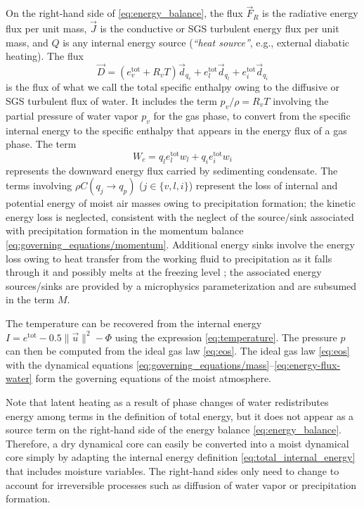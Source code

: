 \documentclass{report}
\begin{document}
On the right-hand side of \eqref{eq:energy_balance}, the flux $\vec{F}_R$ is the radiative energy flux per unit mass, $\vec{J}$ is the conductive or SGS turbulent energy flux per unit mass, and $Q$ is any internal energy source (\emph{``heat source''}, e.g., external diabatic heating). The flux 
\begin{equation}\label{eq:energy-flux-water}
\vec{D} = (e_v^{\mathrm{tot}} + R_v T) \vec{d}_{q_v} + e_l^{\mathrm{tot}} \vec{d}_{q_l} +  e_i^{\mathrm{tot}} \vec{d}_{q_i}
\end{equation}
is the flux of what we call the total specific enthalpy owing to the diffusive or SGS turbulent flux of water. It includes the term $p_v/\rho = R_v T$ involving the partial pressure of water vapor $p_v$ for the gas phase, to convert from the specific internal energy to the specific enthalpy that appears in the energy flux of a gas phase. The term 
\begin{equation}
W_c = q_l e_l^{\mathrm{tot}} w_l + q_i e_i^{\mathrm{tot}} w_i
\end{equation}
represents the downward energy flux carried by sedimenting condensate. The terms involving $\rho C(q_j \rightarrow q_p)$ ($j \in \{ v, l, i \}$) represent the loss of internal and potential energy of moist air masses owing to precipitation formation; the kinetic energy loss is neglected, consistent with the neglect of the source/sink associated with precipitation formation in the momentum balance \eqref{eq:governing_equations/momentum}. Additional energy sinks involve the energy loss owing to heat transfer from the working fluid to precipitation as it falls through it and possibly melts at the freezing level \citep{Raymond13b}; the associated energy sources/sinks are provided by a microphysics parameterization and are subsumed in the term $M$.

The temperature can be recovered from the internal energy $I = e^{\mathrm{tot}} - 0.5 \| \vec{u} \|^2 - \Phi$ using the expression \eqref{eq:temperature}. The pressure $p$ can then be computed from the ideal gas law \eqref{eq:eos}. The ideal gas law \eqref{eq:eos} with the dynamical equations \eqref{eq:governing_equations/mass}--\eqref{eq:energy-flux-water} form the governing equations of the moist atmosphere.

Note that latent heating as a result of phase changes of water redistributes energy among terms in the definition of total energy, but it does not appear as a source term on the right-hand side of the energy balance \eqref{eq:energy_balance}. Therefore, a dry dynamical core can easily be converted into a moist dynamical core simply by adapting the internal energy definition \eqref{eq:total_internal_energy} that includes moisture variables. The right-hand sides only need to change to account for irreversible processes such as diffusion of water vapor or precipitation formation. 
\end{document}
